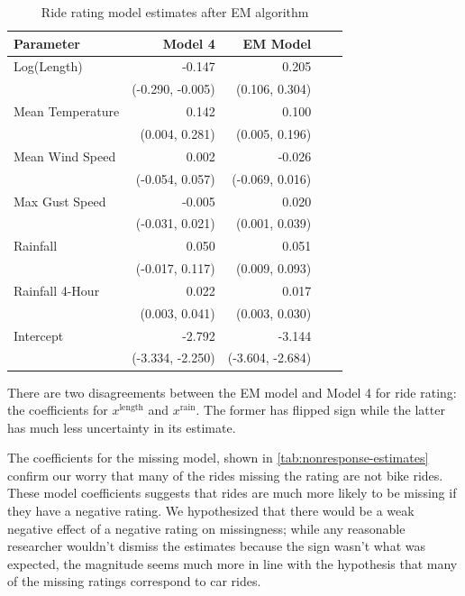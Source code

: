 \documentclass[12pt,twoside]{reedthesis}
\begin{document}
  \begin{table}[htb]
  \caption{Ride rating model estimates after EM algorithm \label{tab:em-model-estimates}}
  \centering
  \begin{tabular}{lrrrr}
  \toprule
  \textbf{Parameter} & \textbf{Model 4} & \textbf{EM Model}\\
  \midrule
  Log(Length) & -0.147 & 0.205\\
  & \footnotesize (-0.290, -0.005) & \footnotesize (0.106, 0.304)\\
  Mean Temperature & 0.142 & 0.100\\
  & \footnotesize (0.004, 0.281) & \footnotesize (0.005, 0.196)\\
  Mean Wind Speed & 0.002 & -0.026\\
  & \footnotesize (-0.054, 0.057) & \footnotesize (-0.069, 0.016)\\
  Max Gust Speed & -0.005 & 0.020\\
  & \footnotesize (-0.031, 0.021) & \footnotesize (0.001, 0.039)\\
  Rainfall & 0.050 & 0.051\\
  & \footnotesize (-0.017, 0.117) & \footnotesize (0.009, 0.093)\\
  Rainfall 4-Hour & 0.022 & 0.017\\
  & \footnotesize (0.003, 0.041) & \footnotesize (0.003, 0.030)\\
  Intercept & -2.792 & -3.144\\
  & \footnotesize (-3.334, -2.250) & \footnotesize (-3.604, -2.684)\\
  \bottomrule
  \end{tabular}
  \end{table}
  
  There are two disagreements between the EM model and Model 4 for ride
  rating: the coefficients for \(x^\text{length}\) and \(x^\text{rain}\).
  The former has flipped sign while the latter has much less uncertainty
  in its estimate.
  
  The coefficients for the missing model, shown in
  \autoref{tab:nonresponse-estimates} confirm our worry that many of the
  rides missing the rating are not bike rides. These model coefficients
  suggests that rides are much more likely to be missing if they have a
  negative rating. We hypothesized that there would be a weak negative
  effect of a negative rating on missingness; while any reasonable
  researcher wouldn't dismiss the estimates because the sign wasn't what
  was expected, the magnitude seems much more in line with the hypothesis
  that many of the missing ratings correspond to car rides.
  
\end{document}
